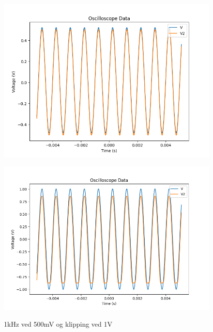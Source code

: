 \begin{figure}[H]
    \centering
    \begin{minipage}[c]{0.49\textwidth}
        \centering
        \includegraphics[width=1\textwidth]{Bilder/Scope_Nice.png} 
        \caption{1kHz ved 500mV og klipping ved 1V}
        \label{fig:Scope_Nice}
    \end{minipage}
    \hfill
    \begin{minipage}[c]{0.49\textwidth}
        \centering
        \includegraphics[width=1\textwidth]{Bilder/Scope_Unice.png} 
        \label{fig:Scope_Unice}
    \end{minipage}
\end{figure}

